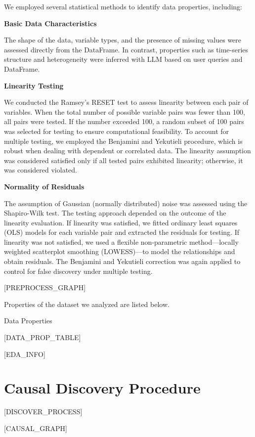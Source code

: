\documentclass{article}
\begin{document}
We employed several statistical methods to identify data properties, including:

\textbf{Basic Data Characteristics}

The shape of the data, variable types, and the presence of missing values were assessed directly from the DataFrame. 
In contrast, properties such as time-series structure and heterogeneity were inferred with LLM based on user queries and DataFrame.

\textbf{Linearity Testing}

We conducted the Ramsey's RESET test to assess linearity between each pair of variables. When the total number of possible variable pairs was fewer than 100, all pairs were tested. If the number exceeded 100, a random subset of 100 pairs was selected for testing to ensure computational feasibility. 
To account for multiple testing, we employed the Benjamini and Yekutieli procedure, which is robust when dealing with dependent or correlated data. 
The linearity assumption was considered satisfied only if all tested pairs exhibited linearity; otherwise, it was considered violated.

\textbf{Normality of Residuals}

The assumption of Gaussian (normally distributed) noise was assessed using the Shapiro-Wilk test. 
The testing approach depended on the outcome of the linearity evaluation. 
If linearity was satisfied, we fitted ordinary least squares (OLS) models for each variable pair and extracted the residuals for testing. 
If linearity was not satisfied, we used a flexible non-parametric method—locally weighted scatterplot smoothing (LOWESS)—to model the relationships and obtain residuals. 
The Benjamini and Yekutieli correction was again applied to control for false discovery under multiple testing.


[PREPROCESS_GRAPH]

Properties of the dataset we analyzed are listed below.

\begin{table}[H]
    \centering
    \caption{Data Properties}
[DATA_PROP_TABLE]
\end{table}

[EDA_INFO]

\section{Causal Discovery Procedure}
[DISCOVER_PROCESS]

[CAUSAL_GRAPH]
\end{document}
